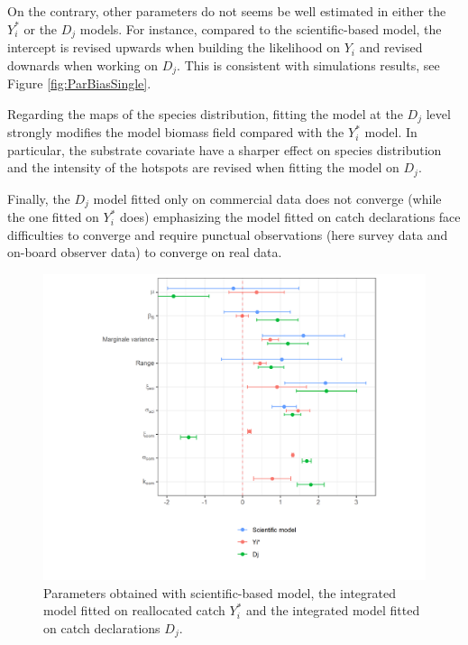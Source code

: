 \documentclass[
  english,
  man,floatsintext]{apa6}
\begin{document}
On the contrary, other parameters do not seems be well estimated in either the \(Y_i^*\) or the \(D_j\) models. For instance, compared to the scientific-based model, the intercept is revised upwards when building the likelihood on \(Y_i\) and revised downards when working on \(D_j\). This is consistent with simulations results, see Figure \ref{fig:ParBiasSingle}.

Regarding the maps of the species distribution, fitting the model at the \(D_j\) level strongly modifies the model biomass field compared with the \(Y_i^*\) model. In particular, the substrate covariate have a sharper effect on species distribution and the intensity of the hotspots are revised when fitting the model on \(D_j\).

Finally, the \(D_j\) model fitted only on commercial data does not converge (while the one fitted on \(Y_i^*\) does) emphasizing the model fitted on catch declarations face difficulties to converge and require punctual observations (here survey data and on-board observer data) to converge on real data.

\begin{figure}
\centering
\includegraphics{images/par_plot.png}
\caption{\label{fig:CaseStudyPar} Parameters obtained with scientific-based model, the integrated model fitted on reallocated catch \(Y_i^*\) and the integrated model fitted on catch declarations \(D_j\).}
\end{figure}
\end{document}
